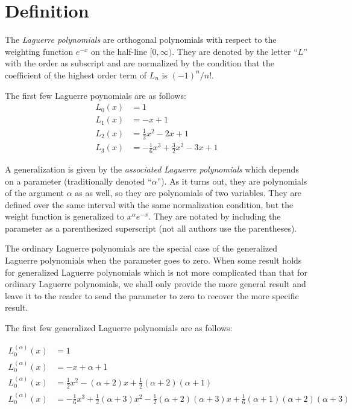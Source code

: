 \documentclass[12pt]{article}
\begin{document}
\section{Definition}

The \emph{Laguerre polynomials} are orthogonal polynomials with respect to the 
weighting function $e^{-x}$ on the half-line $[0,\infty)$.  They are denoted 
by the letter ``$L$'' with the order as subscript and are normalized by the condition that the coefficient of the highest order term of $L_n$ is 
$(-1)^n / n!$. 

The first few Laguerre poynomials are as follows:
\begin{align*}
L_0 (x) &= 1 \\
L_1 (x) &= -x + 1 \\
L_2 (x) &= \frac{1}{2} x^2 - 2x + 1 \\
L_3 (x) &= -\frac{1}{6} x^3 + \frac{3}{2} x^2 - 3 x + 1 
\end{align*}

A generalization is given by the \emph{associated Laguerre polynomials}
which depends on a parameter (traditionally denoted ``$\alpha$'').  As it 
turns out, they are polynomials of the argument $\alpha$ as as well, so 
they are polynomials of two variables.  They  are defined over the same 
interval with the same normalization condition, but the weight function 
is generalized to $x^\alpha e^{-x}$.  They are notated by including the 
parameter as a parenthesized superscript (not all authors use the
parentheses).

The ordinary Laguerre polynomials are the special case of the generalized
Laguerre polynomials when the parameter goes to zero.  When some result
holds for generalized Laguerre polynomials which is not more complicated
than that for ordinary Laguerre polynomials, we shall only provide the more
general result and leave it to the reader to send the parameter to zero
to recover the more specific result. 

The first few generalized Laguerre polynomials are as follows:

\begin{align*}
L_0^{(\alpha)} (x) &= 1 \\
L_0^{(\alpha)} (x) &= -x + \alpha + 1 \\
L_0^{(\alpha)} (x) &= \frac{1}{2} x^2 - (\alpha + 2) x + \frac{1}{2}
(\alpha + 2) (\alpha + 1) \\
L_0^{(\alpha)} (x) &= - \frac{1}{6} x^3 + \frac{1}{2} (\alpha + 3) x^2 -
\frac{1}{2} (\alpha + 2) (\alpha + 3) x + \frac{1}{6} (\alpha + 1)
(\alpha + 2) (\alpha + 3)
\end{align*}
\end{document}
